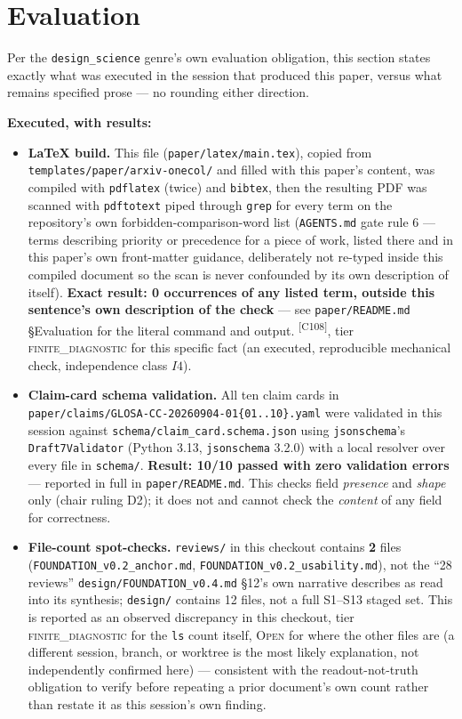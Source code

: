 \documentclass[11pt]{article}
\newcommand{\FiniteDiag}{\textsc{finite\_diagnostic}}
\newcommand{\OpenTier}{\textsc{Open}}
\newcommand{\claimref}[1]{\textsuperscript{[#1]}}
\begin{document}
\section{Evaluation}
\label{sec:evaluation}
Per the \texttt{design\_science} genre's own evaluation obligation, this section states exactly
what was executed in the session that produced this paper, versus what remains specified prose ---
no rounding either direction.

\textbf{Executed, with results:}
\begin{itemize}
  \item \textbf{LaTeX build.} This file (\texttt{paper/latex/main.tex}), copied from
    \texttt{templates/paper/arxiv-onecol/} and filled with this paper's content, was compiled with
    \texttt{pdflatex} (twice) and \texttt{bibtex}, then the resulting PDF was scanned with
    \texttt{pdftotext} piped through \texttt{grep} for every term on the repository's own
    forbidden-comparison-word list (\texttt{AGENTS.md} gate rule 6 --- terms describing priority
    or precedence for a piece of work, listed there and in this paper's own front-matter guidance,
    deliberately not re-typed inside this compiled document so the scan is never confounded by its
    own description of itself). \textbf{Exact result: 0 occurrences of any listed term, outside
    this sentence's own description of the check} --- see \texttt{paper/README.md} \S Evaluation
    for the literal command and output. \claimref{C108}, tier \FiniteDiag{} for this specific fact
    (an executed, reproducible mechanical check, independence class $I4$).
  \item \textbf{Claim-card schema validation.} All ten claim cards in
    \texttt{paper/claims/GLOSA-CC-20260904-01\{01..10\}.yaml} were validated in this session
    against \texttt{schema/claim\_card.schema.json} using \texttt{jsonschema}'s
    \texttt{Draft7Validator} (Python 3.13, \texttt{jsonschema} 3.2.0) with a local resolver over
    every file in \texttt{schema/}. \textbf{Result: 10/10 passed with zero validation errors} ---
    reported in full in \texttt{paper/README.md}. This checks field \emph{presence} and
    \emph{shape} only (chair ruling D2); it does not and cannot check the \emph{content} of any
    field for correctness.
  \item \textbf{File-count spot-checks.} \texttt{reviews/} in this checkout contains
    \textbf{2} files (\texttt{FOUNDATION\_v0.2\_anchor.md}, \texttt{FOUNDATION\_v0.2\_usability.md}),
    not the ``28 reviews'' \texttt{design/FOUNDATION\_v0.4.md} \S12's own narrative describes as
    read into its synthesis; \texttt{design/} contains 12 files, not a full S1--S13 staged set.
    This is reported as an observed discrepancy in this checkout, tier \FiniteDiag{} for the
    \texttt{ls} count itself, \OpenTier{} for where the other files are (a different session,
    branch, or worktree is the most likely explanation, not independently confirmed here) ---
    consistent with the readout-not-truth obligation to verify before repeating a prior
    document's own count rather than restate it as this session's own finding.
\end{itemize}
\end{document}

